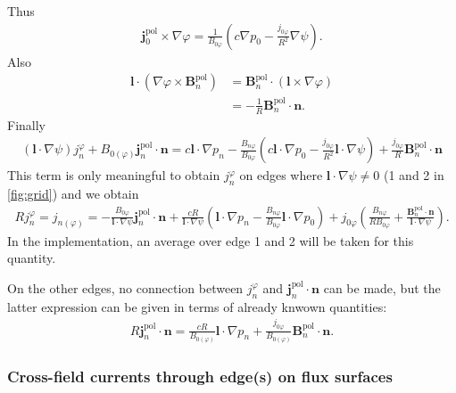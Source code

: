 \documentclass[a4paper, 10pt, english]{article}
\let\temp\vartheta
\let\vartheta\theta
\let\theta\temp
\let\temp\varphi
\let\varphi\phi
\let\phi\temp
\let\vec\symbf
\newcommand*\pol{\ensuremath{\textrm{pol}}}
\begin{document}
Thus
\begin{gather}
  \vec{j}_{0}^{\pol} \times \nabla \phi = \frac{1}{B_{0 \phi}} \left( c \nabla p_{0} - \frac{j_{0 \phi}}{R^{2}} \nabla \psi \right).
\end{gather}
Also
\begin{align}
  \vec{l} \cdot (\nabla \phi \times \vec{B}_{n}^{\pol}) &= \vec{B}_{n}^{\pol} \cdot (\vec{l} \times \nabla \phi) \nonumber \\
  &= -\frac{1}{R} \vec{B}_{n}^{\pol} \cdot \vec{n}.
\end{align}
Finally
\begin{gather}
  (\vec{l} \cdot \nabla \psi) j_{n}^{\phi} + B_{0 (\phi)} \vec{j}_{n}^{\pol} \cdot \vec{n} = c \vec{l} \cdot \nabla p_{n} - \frac{B_{n \phi}}{B_{0 \phi}} \left( c \vec{l} \cdot \nabla p_{0} - \frac{j_{0 \phi}}{R^{2}} \vec{l} \cdot \nabla \psi \right) + \frac{j_{0 \phi}}{R} \vec{B}_{n}^{\pol} \cdot \vec{n} \label{eq:jnxB0-1}
\end{gather}
This term is only meaningful to obtain $j_{n}^{\phi}$ on edges where $\vec{l} \cdot \nabla \psi \neq 0$ (1 and 2 in \cref{fig:grid}) and we obtain
\begin{gather}
  R j_{n}^{\phi} = j_{n (\phi)} = -\frac{B_{0 \phi}}{\vec{l} \cdot \nabla \psi} \vec{j}_{n}^{\pol} \cdot \vec{n} + \frac{c R}{\vec{l} \cdot \nabla \psi} \left( \vec{l} \cdot \nabla p_{n} - \frac{B_{n \phi}}{B_{0 \phi}} \vec{l} \cdot \nabla p_{0} \right) + j_{0 \phi} \left( \frac{B_{n \phi}}{R B_{0 \phi}} + \frac{\vec{B}_{n}^{\pol} \cdot \vec{n}}{\vec{l} \cdot \nabla \psi} \right). \label{eq:jnxB0-1-1}
\end{gather}
In the implementation, an average over edge 1 and 2 will be taken for this quantity.

On the other edges, no connection between $j_{n}^{\phi}$ and $\vec{j}_{n}^{\pol} \cdot \vec{n}$ can be made, but the latter expression can be given in terms of already knwown quantities:
\begin{gather}
  R \vec{j}_{n}^{\pol} \cdot \vec{n} = \frac{c R}{B_{0 (\phi)}} \vec{l} \cdot \nabla p_{n} + \frac{j_{0 \phi}}{B_{0 (\phi)}} \vec{B}_{n}^{\pol} \cdot \vec{n}. \label{eq:I3}
\end{gather}

\subsubsection{Cross-field currents through edge(s) on flux surfaces}
\end{document}
